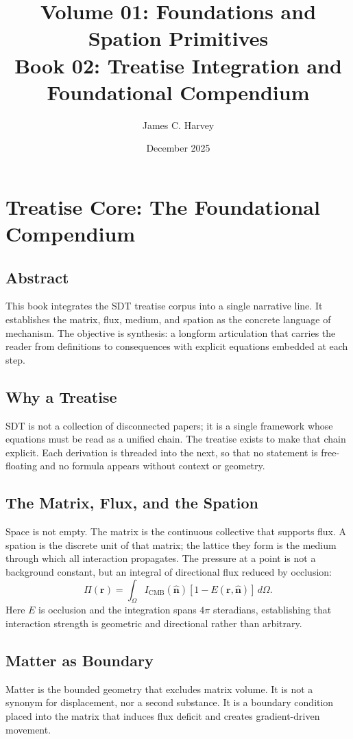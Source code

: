 \documentclass[12pt]{book}
\title{Volume 01: Foundations and Spation Primitives \\ Book 02: Treatise Integration and Foundational Compendium}
\author{James C. Harvey}
\date{December 2025}
\begin{document}
\maketitle

\tableofcontents

\chapter{Treatise Core: The Foundational Compendium}

\section*{Abstract}
This book integrates the SDT treatise corpus into a single narrative line. It establishes the matrix,
flux, medium, and spation as the concrete language of mechanism. The objective is synthesis: a longform
articulation that carries the reader from definitions to consequences with explicit equations embedded
at each step.

\section{Why a Treatise}
SDT is not a collection of disconnected papers; it is a single framework whose equations must be read as
a unified chain. The treatise exists to make that chain explicit. Each derivation is threaded into the next,
so that no statement is free-floating and no formula appears without context or geometry.

\section{The Matrix, Flux, and the Spation}
Space is not empty. The matrix is the continuous collective that supports flux. A spation is the discrete
unit of that matrix; the lattice they form is the medium through which all interaction propagates.
The pressure at a point is not a background constant, but an integral of directional flux reduced by
occlusion:
\begin{equation}
\Pi(\mathbf{r}) = \int_{\Omega} I_{\text{CMB}}(\hat{\mathbf{n}})\left[1 - E(\mathbf{r},\hat{\mathbf{n}})\right]\, d\Omega.
\end{equation}
Here $E$ is occlusion and the integration spans $4\pi$ steradians, establishing that interaction strength
is geometric and directional rather than arbitrary.

\section{Matter as Boundary}
Matter is the bounded geometry that excludes matrix volume. It is not a synonym for displacement, nor a
second substance. It is a boundary condition placed into the matrix that induces flux deficit and creates
gradient-driven movement.
\end{document}

